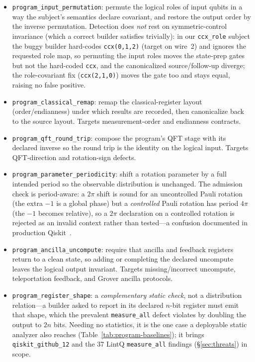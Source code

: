 \begin{itemize}
  \item \texttt{program\_input\_permutation}: permute the logical roles of input qubits in a way the subject's semantics declare covariant, and restore the output order by the inverse permutation. Detection does \emph{not} rest on symmetric-control invariance (which a correct builder satisfies trivially): in our \texttt{ccx\_role} subject the buggy builder hard-codes \texttt{ccx(0,1,2)} (target on wire~2) and ignores the requested role map, so permuting the input roles moves the state-prep gates but not the hard-coded \texttt{ccx}, and the canonicalized source/follow-up diverge; the role-covariant fix (\texttt{ccx(2,1,0)}) moves the gate too and stays equal, raising no false positive.
  \item \texttt{program\_classical\_remap}: remap the classical-register layout (order/endianness) under which results are recorded, then canonicalize back to the source layout. Targets measurement-order and endianness contracts.
  \item \texttt{program\_qft\_round\_trip}: compose the program's QFT stage with its declared inverse so the round trip is the identity on the logical input. Targets QFT-direction and rotation-sign defects.
  \item \texttt{program\_parameter\_periodicity}: shift a rotation parameter by a full intended period so the observable distribution is unchanged. The admission check is period-aware: a $2\pi$ shift is sound for an uncontrolled Pauli rotation (the extra $-1$ is a global phase) but a \emph{controlled} Pauli rotation has period $4\pi$ (the $-1$ becomes relative), so a $2\pi$ declaration on a controlled rotation is rejected as an invalid context rather than tested---a confusion documented in production Qiskit~\cite{qiskit13670}.
  \item \texttt{program\_ancilla\_uncompute}: require that ancilla and feedback registers return to a clean state, so adding or completing the declared uncompute leaves the logical output invariant. Targets missing/incorrect uncompute, teleportation feedback, and Grover ancilla protocols.
  \item \texttt{program\_register\_shape}: a \emph{complementary static check}, not a distribution relation---a builder asked to report in its declared $n$-bit register must emit that shape, which the prevalent \texttt{measure\_all} defect violates by doubling the output to $2n$ bits. Needing no statistics, it is the one case a deployable static analyzer also reaches (Table~\ref{tab:program-baselines}); it brings \texttt{qiskit\_github\_12} and the 37 LintQ \texttt{measure\_all} findings (\S\ref{sec:threats}) in scope.
\end{itemize}

